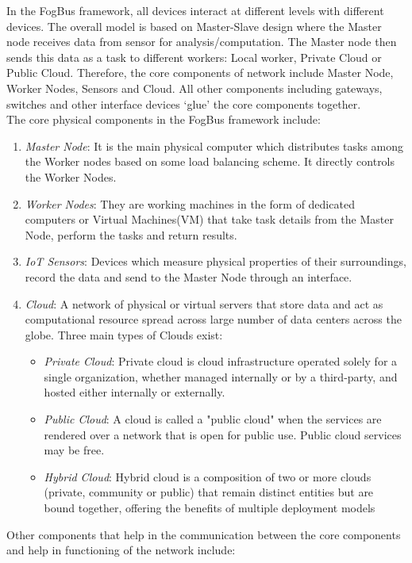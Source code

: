 \documentclass[AMA,STIX1COL]{WileyNJD-v2}
\begin{document}
In the FogBus framework, all devices interact at different levels with different devices. The overall model is based on Master-Slave design where the Master node receives data from sensor for analysis/computation. The Master node then sends this data as a task to different workers: Local worker, Private Cloud or Public Cloud. Therefore, the core components of network include Master Node, Worker Nodes, Sensors and Cloud. All other components including gateways, switches and other interface devices ‘glue’ the core components together.\\
The core physical components in the FogBus framework include:
\begin{enumerate}
\item \textit{Master Node}: It is the main physical computer which distributes tasks among the Worker nodes based on some load balancing scheme. It directly controls the Worker Nodes.
\item \textit{Worker Nodes}: They are working machines in the form of dedicated computers or Virtual Machines(VM) that take task details from the Master Node, perform the tasks and return results. 
\item \textit{IoT Sensors}: Devices which measure physical properties of their surroundings, record the data and send to the Master Node through an interface. 
\item \textit{Cloud}: A network of physical or virtual servers that store data and act as computational resource spread across large number of data centers across the globe. Three main types of Clouds exist:
\begin{itemize}
\item \textit{Private Cloud}: Private cloud is cloud infrastructure operated solely for a single organization, whether managed internally or by a third-party, and hosted either internally or externally.
\item \textit{Public Cloud}: A cloud is called a "public cloud" when the services are rendered over a network that is open for public use. Public cloud services may be free.
\item \textit{Hybrid Cloud}: Hybrid cloud is a composition of two or more clouds (private, community or public) that remain distinct entities but are bound together, offering the benefits of multiple deployment models
\end{itemize}
\end{enumerate}
Other components that help in the communication between the core components and help in functioning of the network include:
\end{document}
